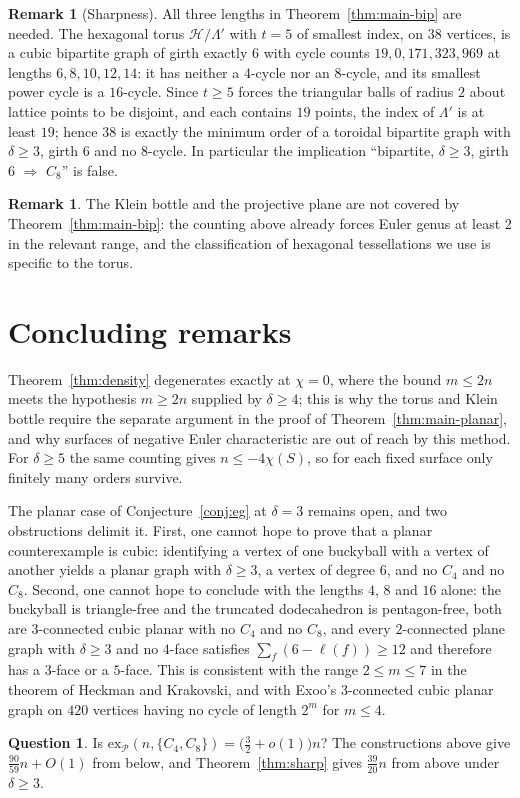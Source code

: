 \documentclass[11pt]{article}
\theoremstyle{plain}
\theoremstyle{definition}
\newtheorem{remark}[theorem]{Remark}
\newtheorem{question}[theorem]{Question}
\newcommand{\Cfour}{C_4}
\newcommand{\Ceight}{C_8}
\begin{document}
\begin{remark}[Sharpness]
All three lengths in Theorem~\ref{thm:main-bip} are needed. The hexagonal torus
$\mathcal H/\Lambda'$ with $t=5$ of smallest index, on $38$ vertices, is a cubic
bipartite graph of girth exactly $6$ with cycle counts $19,0,171,323,969$ at
lengths $6,8,10,12,14$: it has neither a $4$-cycle nor an $8$-cycle, and its
smallest power cycle is a $16$-cycle. Since $t\ge5$ forces the triangular balls
of radius $2$ about lattice points to be disjoint, and each contains $19$ points,
the index of $\Lambda'$ is at least $19$; hence $38$ is exactly the minimum order
of a toroidal bipartite graph with $\delta\ge3$, girth $6$ and no $8$-cycle. In
particular the implication ``bipartite, $\delta\ge3$, girth $6$ $\Rightarrow$
$\Ceight$'' is false.
\end{remark}

\begin{remark}
The Klein bottle and the projective plane are not covered by
Theorem~\ref{thm:main-bip}: the counting above already forces Euler genus at
least $2$ in the relevant range, and the classification of hexagonal
tessellations we use is specific to the torus.
\end{remark}

\section{Concluding remarks}

Theorem~\ref{thm:density} degenerates exactly at $\chi=0$, where the bound
$m\le 2n$ meets the hypothesis $m\ge2n$ supplied by $\delta\ge4$; this is why
the torus and Klein bottle require the separate argument in the proof of
Theorem~\ref{thm:main-planar}, and why surfaces of negative Euler
characteristic are out of reach by this method. For $\delta\ge5$ the same
counting gives $n\le-4\chi(S)$, so for each fixed surface only finitely many
orders survive.

The planar case of Conjecture~\ref{conj:eg} at $\delta=3$ remains open, and two
obstructions delimit it. First, one cannot hope to prove that a planar
counterexample is cubic: identifying a vertex of one buckyball with a vertex of
another yields a planar graph with $\delta\ge3$, a vertex of degree $6$, and no
$\Cfour$ and no $\Ceight$. Second, one cannot hope to conclude with the lengths
$4$, $8$ and $16$ alone: the buckyball is triangle-free and the truncated
dodecahedron is pentagon-free, both are $3$-connected cubic planar with no
$\Cfour$ and no $\Ceight$, and every $2$-connected plane graph with $\delta\ge3$
and no $4$-face satisfies $\sum_f(6-\ell(f))\ge12$ and therefore has a $3$-face
or a $5$-face. This is consistent with the range $2\le m\le7$ in the theorem of
Heckman and Krakovski, and with Exoo's $3$-connected cubic planar graph on $420$
vertices having no cycle of length $2^m$ for $m\le4$.

\begin{question}
Is $\mathrm{ex}_{\mathcal P}(n,\{\Cfour,\Ceight\})=\bigl(\tfrac32+o(1)\bigr)n$?
The constructions above give $\tfrac{90}{59}n+O(1)$ from below, and
Theorem~\ref{thm:sharp} gives $\tfrac{39}{20}n$ from above under $\delta\ge3$.
\end{question}
\end{document}
